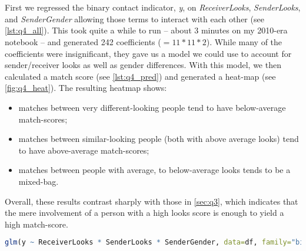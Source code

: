 \section{}
First we regressed the binary contact indicator, \textit{y}, on \textit{ReceiverLooks}, \textit{SenderLooks}, and \textit{SenderGender} allowing those terms to interact with each other (see \vref{lst:q4_all}).  This took quite a while to run -- about 3 minutes on my 2010-era notebook -- and generated 242 coefficients ($=11 * 11 * 2$).  While many of the coefficients were insignificant, they gave us a model we could use to account for sender/receiver looks as well as gender differences.  With this model, we then calculated a match score (see \vref{lst:q4_pred}) and generated a heat-map (see \vref{fig:q4_heat}).  The resulting heatmap shows:
\begin{itemize}
\item matches between very different-looking people tend to have below-average match-scores;
\item matches between similar-looking people (both with above average looks) tend to have above-average match-scores;
\item matches between people with average, to below-average looks tends to be a mixed-bag.
\end{itemize}

Overall, these results contrast sharply with those in \cref{sec:q3}, which indicates that the mere involvement of a person with a high looks score is enough to yield a high match-score.


\begin{lstlisting}[language=R,label=lst:q4_all,caption=Regressing y on all available data.]
glm(y ~ ReceiverLooks * SenderLooks * SenderGender, data=df, family="binomial")
\end{lstlisting}



